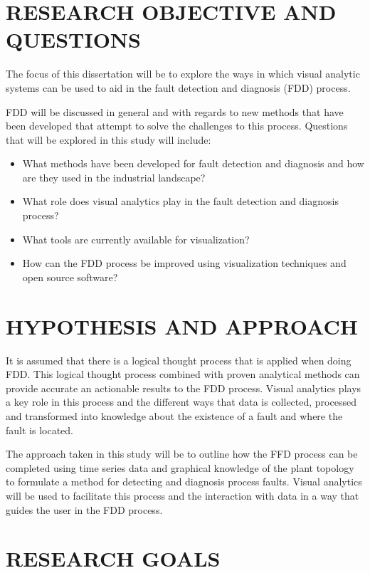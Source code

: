 \section{RESEARCH OBJECTIVE AND QUESTIONS}

The focus of this dissertation will be to explore the ways in which visual analytic systems can be used to aid in the fault detection and diagnosis (FDD) process. \par
FDD will be discussed in general and with regards to new methods that have been developed that attempt to solve the challenges to this process.
Questions that will be explored in this study will include:
\begin{itemize}
\item What methods have been developed for fault detection and diagnosis and how are they used in the industrial landscape?
\item What role does visual analytics play in the fault detection and diagnosis process?
\item What tools are currently available for visualization?
\item How can the FDD process be improved using visualization techniques and open source software?
\end{itemize}

\section{HYPOTHESIS AND APPROACH}

It is assumed that there is a logical thought process that is applied when doing FDD. This logical thought process combined with proven analytical methods can provide accurate an actionable results to the FDD process. Visual analytics plays a key role in this process and the different ways that data is collected, processed and transformed into knowledge about the existence of a fault and where the fault is located.

The approach taken in this study will be to outline how the FFD process can be completed using time series data and graphical knowledge of the plant topology to formulate a method for detecting and diagnosis process faults. Visual analytics will be used to facilitate this process and the interaction with data in a way that guides the user in the FDD process.

\section{RESEARCH GOALS}

